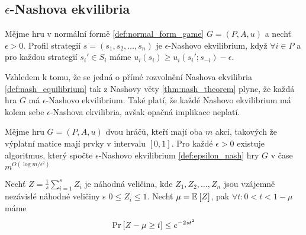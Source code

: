 \subsection{$\epsilon$-Nashova ekvilibria}
\begin{definition}
\label{def:epsilon_nash}
Mějme hru v normální formě \ref{def:normal_form_game} $G=(P,A,u)$ a nechť $\epsilon > 0$. 
Profil strategií $s = (s_1,s_2, \dots, s_n)$ je $\epsilon$-Nashovo ekvilibrium, když $\forall i \in P$ a pro každou strategií $s_i' \in S_i$ máme $u_i(s_i) \geq u_i(s_i' ; s_{-i}) - \epsilon$.
\end{definition}
Vzhledem k tomu, že se jedná o přímé rozvolnění Nashova ekvilibria \ref{def:nash_equilibrium} tak z Nashovy věty \ref{thm:nash_theorem} plyne, že každá hra $G$ má $\epsilon$-Nashovo ekvilibrium.
Také platí, že každé Nashovo ekvilibrium má kolem sebe $\epsilon$-Nashova ekvilibria, avšak opačná implikace neplatí. 

\begin{theorem}
\label{thm:e_nash_in_time}
Mějme hru $G = (P,A,u)$ dvou hráčů, kteří mají oba $m$ akcí, takových že výplatní matice mají prvky v intervalu $[0,1]$. 
Pro každé $\epsilon >0$ existuje algoritmus, který spočte $\epsilon$-Nashovo ekvilibrium \ref{def:epsilon_nash} hry $G$ v čase $m^{O(\log m / \epsilon^2)}$
\end{theorem}
\begin{theorem}
\label{thm:hoeffding_bound}
Nechť $Z = \frac{1}{s} \sum^s_{i = 1} Z_i$ je náhodná veličina, kde $Z_1, Z_2, \dots, Z_n$ jsou vzájemně nezávislé náhodné veličiny s $0 \leq Z_i \leq 1$.
Nechť $\mu = \mathbb{E}_{}\left[Z\right]$, pak $\forall t: 0<t<1 - \mu$ máme 
\[
    \text{Pr}_{}\left[Z - \mu \geq t\right] \leq e^{-2st^2}
\]
\end{theorem}

